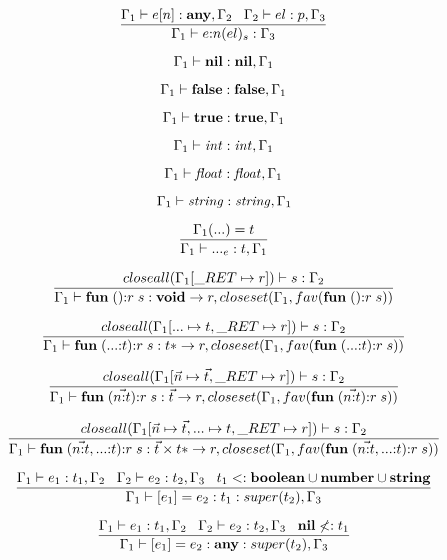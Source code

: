 \[
\dfrac{\Gamma_{1} \vdash e[n]:\mathbf{any}, \Gamma_{2} \;\;\;
       \Gamma_{2} \vdash el:p, \Gamma_{3}}
      {\Gamma_{1} \vdash e{:}n(el)_{s}:\Gamma_{3}}
\]

\[
\Gamma_{1} \vdash \mathbf{nil}:\mathbf{nil}, \Gamma_{1}
\]

\[
\Gamma_{1} \vdash \mathbf{false}:\mathbf{false}, \Gamma_{1}
\]

\[
\Gamma_{1} \vdash \mathbf{true}:\mathbf{true}, \Gamma_{1}
\]

\[
\Gamma_{1} \vdash {\it int}:{\it int}, \Gamma_{1}
\]

\[
\Gamma_{1} \vdash {\it float}:{\it float}, \Gamma_{1}
\]

\[
\Gamma_{1} \vdash {\it string}:{\it string}, \Gamma_{1}
\]

\[
\dfrac{\Gamma_{1}({...}) = t}
      {\Gamma_{1} \vdash {...}_{e}:t, \Gamma_{1}}
\]

\[
\dfrac{closeall(\env_{1}[\ret \mapsto r]) \vdash s:\env_{2}}
      {\env_{1} \vdash \mathbf{fun} \; (){:}r \; s:\Void \rightarrow r, closeset(\env_{1}, fav(\mathbf{fun} \; (){:}r \; s))}
\]

\[
\dfrac{closeall(\env_{1}[{...} \mapsto t, \ret \mapsto r]) \vdash s:\env_{2}}
      {\env_{1} \vdash \mathbf{fun} \; ({...}{:}t){:}r \; s:t{*} \rightarrow r, closeset(\env_{1}, fav(\mathbf{fun} \; ({...}{:}t){:}r \; s))}
\]

\[
\dfrac{closeall(\env_{1}[\vec{n} \mapsto \vec{t}, \ret \mapsto r]) \vdash s:\env_{2}}
      {\env_{1} \vdash \mathbf{fun} \; (\vec{n{:}t}){:}r \; s:\vec{t} \rightarrow r, closeset(\env_{1}, fav(\mathbf{fun} \; (\vec{n{:}t}){:}r \; s))}
\]

\[
\dfrac{closeall(\env_{1}[\vec{n} \mapsto \vec{t}, {...} \mapsto t, \ret \mapsto r]) \vdash s:\env_{2}}
      {\env_{1} \vdash \mathbf{fun} \; (\vec{n{:}t},{...}{:}t){:}r \; s: \vec{t} \times t{*} \rightarrow r, closeset(\env_{1}, fav(\mathbf{fun} \; (\vec{n{:}t},{...}{:}t){:}r \; s))}
\]

\[
\dfrac{\Gamma_{1} \vdash e_{1}:t_{1}, \Gamma_{2} \;\;\;
       \Gamma_{2} \vdash e_{2}:t_{2}, \Gamma_{3} \;\;\;
       t_{1} <: \mathbf{boolean} \cup \mathbf{number} \cup \mathbf{string}}
      {\Gamma_{1} \vdash [e_{1}] = e_{2}: t_{1}:super(t_{2}), \Gamma_{3}}
\]

\[
\dfrac{\Gamma_{1} \vdash e_{1}:t_{1}, \Gamma_{2} \;\;\;
       \Gamma_{2} \vdash e_{2}:t_{2}, \Gamma_{3} \;\;\;
       \mathbf{nil} \not<: t_{1}}
      {\Gamma_{1} \vdash [e_{1}] = e_{2}: \mathbf{any}:super(t_{2}), \Gamma_{3}}
\]

